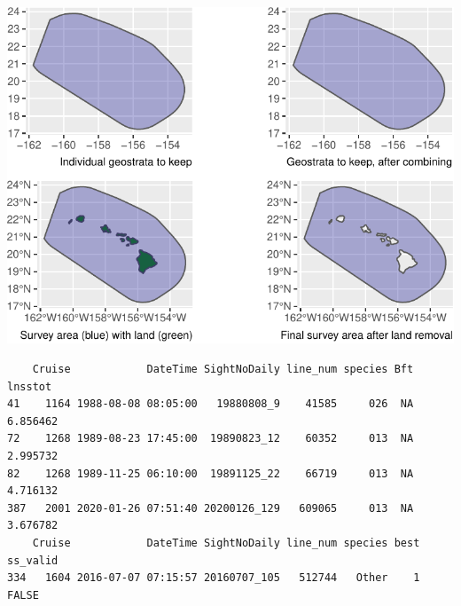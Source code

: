 \documentclass[
]{book}
\begin{document}
\includegraphics{figures/unnamed-chunk-178-1.pdf}

\begin{verbatim}
    Cruise            DateTime SightNoDaily line_num species Bft  lnsstot
41    1164 1988-08-08 08:05:00   19880808_9    41585     026  NA 6.856462
72    1268 1989-08-23 17:45:00  19890823_12    60352     013  NA 2.995732
82    1268 1989-11-25 06:10:00  19891125_22    66719     013  NA 4.716132
387   2001 2020-01-26 07:51:40 20200126_129   609065     013  NA 3.676782
    Cruise            DateTime SightNoDaily line_num species best ss_valid
334   1604 2016-07-07 07:15:57 20160707_105   512744   Other    1    FALSE
\end{verbatim}
\end{document}
